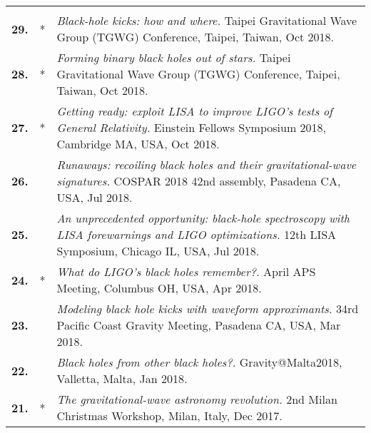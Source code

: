 {\begin{longtable}{rp{0.3cm}p{15.8cm}}
\vspace{0.05cm}\\
%
\textbf{29.} & * & \textit{Black-hole kicks: how and where.}
\newline{}
Taipei Gravitational Wave Group (TGWG) Conference, Taipei, Taiwan, Oct 2018.
\vspace{0.05cm}\\
%
\textbf{28.} & * & \textit{Forming binary black holes out of stars.}
\newline{}
Taipei Gravitational Wave Group (TGWG) Conference, Taipei, Taiwan, Oct 2018.
\vspace{0.05cm}\\
%
\textbf{27.} & * & \textit{Getting ready: exploit LISA to improve LIGO's tests of General Relativity.}
\newline{}
Einstein Fellows Symposium 2018, Cambridge MA, USA, Oct 2018.
\vspace{0.05cm}\\
%
\textbf{26.} &  & \textit{Runaways: recoiling black holes and their gravitational-wave signatures.}
\newline{}
COSPAR 2018 42nd assembly, Pasadena CA, USA, Jul 2018.
\vspace{0.05cm}\\
%
\textbf{25.} &  & \textit{An unprecedented opportunity: black-hole spectroscopy with LISA forewarnings and LIGO optimizations.}
\newline{}
12th LISA Symposium, Chicago IL, USA, Jul 2018.
\vspace{0.05cm}\\
%
\textbf{24.} & * & \textit{What do LIGO's black holes remember?.}
\newline{}
April APS Meeting, Columbus OH, USA, Apr 2018.
\vspace{0.05cm}\\
%
\textbf{23.} &  & \textit{Modeling black hole kicks with waveform approximants.}
\newline{}
34rd Pacific Coast Gravity Meeting, Pasadena CA, USA, Mar 2018.
\vspace{0.05cm}\\
%
\textbf{22.} &  & \textit{Black holes from other black holes?.}
\newline{}
Gravity@Malta2018, Valletta, Malta, Jan 2018.
\vspace{0.05cm}\\
%
\textbf{21.} & * & \textit{The gravitational-wave astronomy revolution.}
\newline{}
2nd Milan Christmas Workshop, Milan, Italy, Dec 2017.

\end{longtable}}
